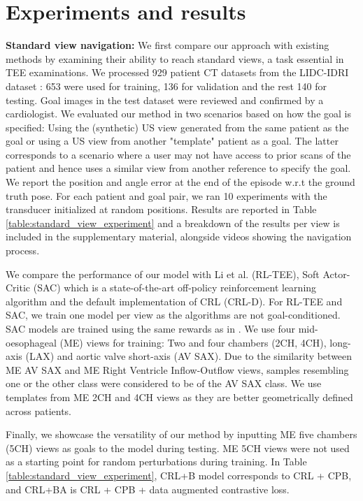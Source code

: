 \section{Experiments and results}
\textbf{Standard view navigation: } We first compare our approach with existing methods by examining their ability to reach standard views, a task essential in TEE examinations. We processed 929 patient CT datasets from the LIDC-IDRI dataset \cite{lidc_idri}: 653 were used for training, 136 for validation and the rest 140 for testing. Goal images in the test dataset were reviewed and confirmed by a cardiologist. We evaluated our method in two scenarios based on how the goal is specified: Using the (synthetic) US view generated from the same patient as the goal or using a US view from another "template" patient as a goal. The latter corresponds to a scenario where a user may not have access to prior scans of the patient and hence uses a similar view from another reference to specify the goal. 
We report the position and angle error at the end of the episode w.r.t the ground truth pose. For each patient and goal pair, we ran 10 experiments with the transducer initialized at random positions. Results are reported in Table \ref{table:standard_view_experiment} and a breakdown of the results per view is included in the supplementary material, alongside videos showing the navigation process.

We compare the performance of our model with  Li et al. \cite{Li2023RLTEEAP} (RL-TEE), Soft Actor-Critic (SAC) \cite{Haarnoja2018SoftAO} which is a state-of-the-art off-policy reinforcement learning algorithm and the default implementation of CRL (CRL-D)\cite{Eysenbach2022ContrastiveLA}. For RL-TEE and SAC, we train one model per view as the algorithms are not goal-conditioned. SAC models are trained using the same rewards as in \cite{Li2023RLTEEAP}. We use four mid-oesophageal (ME) views for training: Two and four chambers (2CH, 4CH), long-axis (LAX) and aortic valve short-axis (AV SAX). Due to the similarity between ME AV SAX and ME Right Ventricle Inflow-Outflow views, samples resembling one or the other class were considered to be of the AV SAX class. We use templates from ME 2CH and 4CH views as they are better geometrically defined across patients.

Finally, we showcase the versatility of our method by inputting ME five chambers (5CH) views as goals to the model during testing. ME 5CH views were not used as a starting point for random perturbations during training. In Table \ref{table:standard_view_experiment}, CRL+B model corresponds to CRL + CPB, and CRL+BA is CRL + CPB + data augmented contrastive loss.

